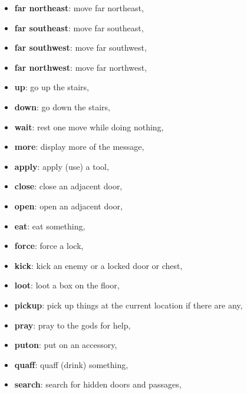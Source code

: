 \begin{MyGreenBox}
\begin{itemize}
		\item \textbf{far northeast}: move far northeast,

		\item \textbf{far southeast}: move far southeast,

		\item \textbf{far southwest}: move far southwest,

		\item \textbf{far northwest}: move far northwest,

		\item \textbf{up}: go up the stairs,

		\item \textbf{down}: go down the stairs,

		\item \textbf{wait}: rest one move while doing nothing,

		\item \textbf{more}: display more of the message,

		\item \textbf{apply}: apply (use) a tool,

		\item \textbf{close}: close an adjacent door,

		\item \textbf{open}: open an adjacent door,

		\item \textbf{eat}: eat something,

		\item \textbf{force}: force a lock,

		\item \textbf{kick}: kick an enemy or a locked door or chest,

		\item \textbf{loot}: loot a box on the floor,

		\item \textbf{pickup}: pick up things at the current location if there are any,

		\item \textbf{pray}: pray to the gods for help,

		\item \textbf{puton}: put on an accessory,

		\item \textbf{quaff}: quaff (drink) something,

		\item \textbf{search}: search for hidden doors and passages,


\end{itemize}
\end{MyGreenBox}

